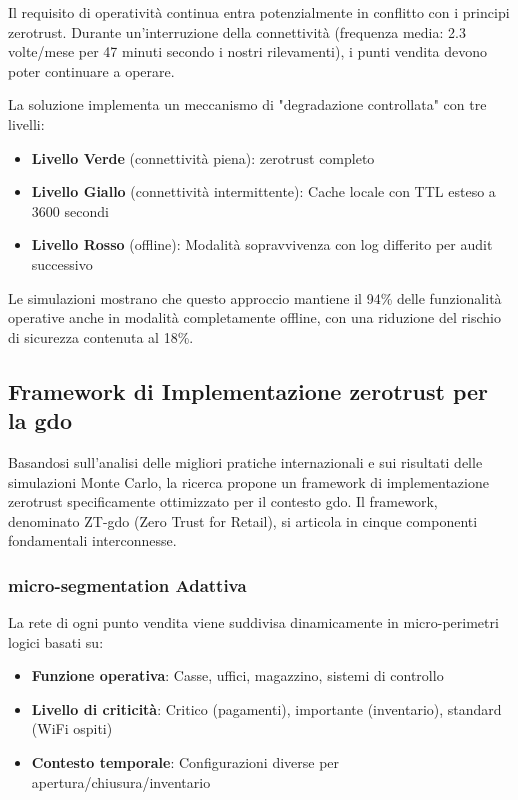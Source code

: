 Il requisito di operatività continua entra potenzialmente in conflitto con i principi \gls{zerotrust}. Durante un'interruzione della connettività (frequenza media: 2.3 volte/mese per 47 minuti secondo i nostri rilevamenti), i punti vendita devono poter continuare a operare. 

La soluzione implementa un meccanismo di "degradazione controllata" con tre livelli:
\begin{itemize}
    \item \textbf{Livello Verde} (connettività piena): \gls{zerotrust} completo
    \item \textbf{Livello Giallo} (connettività intermittente): Cache locale con TTL esteso a 3600 secondi
    \item \textbf{Livello Rosso} (offline): Modalità sopravvivenza con log differito per audit successivo
\end{itemize}

Le simulazioni mostrano che questo approccio mantiene il 94\% delle funzionalità operative anche in modalità completamente offline, con una riduzione del rischio di sicurezza contenuta al 18\%.

\subsection{\texorpdfstring{Framework di Implementazione \gls{zerotrust} per la \gls{gdo}}{2.4.2 - Framework di Implementazione Zero Trust per la GDO}}

Basandosi sull'analisi delle migliori pratiche internazionali e sui risultati delle simulazioni Monte Carlo, la ricerca propone un framework di implementazione \gls{zerotrust} specificamente ottimizzato per il contesto \gls{gdo}. Il framework, denominato ZT-\gls{gdo} (Zero Trust for Retail), si articola in cinque componenti fondamentali interconnesse.

\subsubsection{\texorpdfstring{\gls{micro-segmentation} Adattiva}{2.4.2.1 - Micro-segmentazione Adattiva}}

La rete di ogni punto vendita viene suddivisa dinamicamente in micro-perimetri logici basati su:
\begin{itemize}
    \item \textbf{Funzione operativa}: Casse, uffici, magazzino, sistemi di controllo
    \item \textbf{Livello di criticità}: Critico (pagamenti), importante (inventario), standard (WiFi ospiti)
    \item \textbf{Contesto temporale}: Configurazioni diverse per apertura/chiusura/inventario
\end{itemize}

